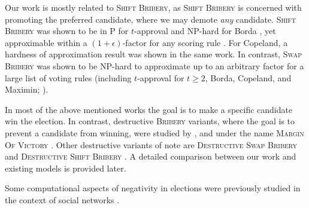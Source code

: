 \documentclass[letterpaper]{article} %
\newcommand{\Bribery}{\textsc{Bribery}}
\newcommand{\swapB}{\textsc{Swap Bribery}}
\newcommand{\shiftB}{\textsc{Shift Bribery}}
\newcommand{\DshiftB}{\textsc{Destructive} \shiftB{}}
\newcommand{\NP}{\mathrm{NP}}
\newcommand{\Pclass}{\mathrm{P}}
\begin{document}
Our work is mostly related to \shiftB{}, as \shiftB{} is concerned with promoting the preferred candidate, where we may demote \emph{any} candidate. \shiftB{} was shown to be in $\Pclass$ for $t$-approval and $\NP$-hard for Borda  \cite{DBLP:conf/sagt/ElkindFS09}, yet approximable within a $(1+\epsilon)$-factor for any scoring rule \cite{DBLP:conf/aaai/FaliszewskiMS19}. For Copeland, a hardness of approximation result was shown in the same work.
In contrast, \swapB{} was shown to be $\NP$-hard to approximate up to an arbitrary factor for a large list of voting rules (including $t$-approval for $t \geq 2$, Borda, Copeland, and Maximin; \citealt{elkind2010approximation}).

In most of the above mentioned works the goal is to make a specific candidate win the election. In contrast, destructive \textsc{Bribery} variants, where the goal is to prevent a candidate from winning, were studied by \citet*{DBLP:journals/jair/FaliszewskiHHR09}, and under the name \textsc{Margin Of Victory}  \cite{magrino2011computing,cary2011estimating,xia2012computing,dey2015estimating}.
Other destructive variants of note are
\textsc{Destructive Swap Bribery} \cite{shiryaev2013elections} and \DshiftB{} \cite{Kaczmarczyk2019destructive}. A detailed comparison between our work and existing models is provided later.

Some computational aspects of negativity in elections were previously  studied  in the context of social networks  \cite{DBLP:conf/ictcs/MehriziCCDP19,DBLP:conf/aaai/CastiglioniF020}. 



\end{document}
